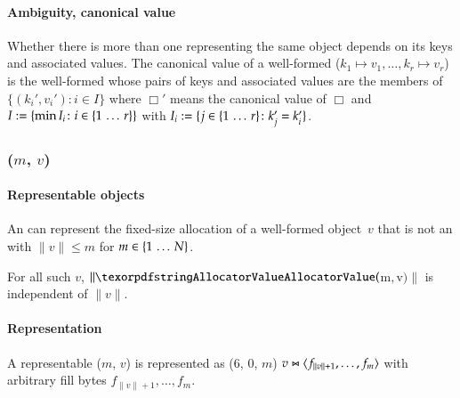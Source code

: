 \paragraph{Ambiguity, canonical value}

Whether there is more than one \DborDictionaryValue{} representing the same object depends on
its keys and associated values.
The canonical value of a well-formed \DborDictionaryValue($k_1 \mapsto v_1, \ldots, k_r \mapsto v_r$) is
the well-formed \DborDictionaryValue{} whose pairs of keys and associated values are the members of
$\{(k_i', v_i') \colon i \in I\}$ where $\Box'$ means the canonical value of $\Box$ and
$I := \{\min I_i\colon i \in \{1 \,\ldots\, r\}\}$
with $I_i := \{j \in \{1 \,\ldots\, r\}\colon k_j' = k_i'\}$.


\subsubsection{\DborAllocatorValue(\texorpdfstring{$m$, $v$}{m, v})}
\hypertarget{sec:def:AllocatorValue}{}

\paragraph{Representable objects}

An \DborAllocatorValue{} can represent the fixed-size allocation of a well-formed object~$v$
that is not an \DborAllocatorValue{} with $\|v\| \le m$ for $m \in \{1 \,\ldots\, N\}$.

For all such $v$, $\|\DborAllocatorValue($m$,{} $v$)\|$ is independent of $\|v\|$.

\paragraph{Representation}

A representable \DborAllocatorValue($m$, $v$) is represented as
\DborNaturalToken*($6$, $0$, $m$) {\Concat} $v \Concat \ByteSequence{f_{\|v\| + 1}, \ldots, f_m}$
with arbitrary fill bytes $f_{\|v\| + 1}, \ldots, f_m$.

